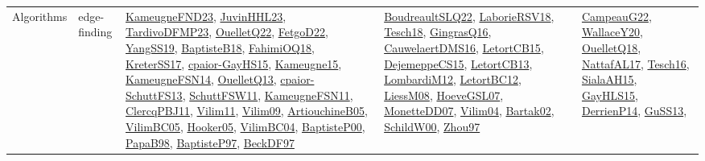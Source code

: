 {\begin{longtable}{lp{3cm}>{\raggedright}p{6cm}>{\raggedright}p{6cm}p{8cm}}
Algorithms & edge-finding & \href{papers/KameugneFND23.pdf}{KameugneFND23}\cite{KameugneFND23}, \href{papers/JuvinHHL23.pdf}{JuvinHHL23}\cite{JuvinHHL23}, \href{papers/TardivoDFMP23.pdf}{TardivoDFMP23}\cite{TardivoDFMP23}, \href{papers/OuelletQ22.pdf}{OuelletQ22}\cite{OuelletQ22}, \href{articles/FetgoD22.pdf}{FetgoD22}\cite{FetgoD22}, \href{papers/YangSS19.pdf}{YangSS19}\cite{YangSS19}, \href{articles/BaptisteB18.pdf}{BaptisteB18}\cite{BaptisteB18}, \href{articles/FahimiOQ18.pdf}{FahimiOQ18}\cite{FahimiOQ18}, \href{articles/KreterSS17.pdf}{KreterSS17}\cite{KreterSS17}, \href{papers/cpaior-GayHS15.pdf}{cpaior-GayHS15}\cite{cpaior-GayHS15}, \href{articles/Kameugne15.pdf}{Kameugne15}\cite{Kameugne15}, \href{articles/KameugneFSN14.pdf}{KameugneFSN14}\cite{KameugneFSN14}, \href{papers/OuelletQ13.pdf}{OuelletQ13}\cite{OuelletQ13}, \href{papers/cpaior-SchuttFS13.pdf}{cpaior-SchuttFS13}\cite{cpaior-SchuttFS13}, \href{articles/SchuttFSW11.pdf}{SchuttFSW11}\cite{SchuttFSW11}, \href{papers/KameugneFSN11.pdf}{KameugneFSN11}\cite{KameugneFSN11}, \href{papers/ClercqPBJ11.pdf}{ClercqPBJ11}\cite{ClercqPBJ11}, \href{papers/Vilim11.pdf}{Vilim11}\cite{Vilim11}, \href{papers/Vilim09.pdf}{Vilim09}\cite{Vilim09}, \href{papers/ArtiouchineB05.pdf}{ArtiouchineB05}\cite{ArtiouchineB05}, \href{articles/VilimBC05.pdf}{VilimBC05}\cite{VilimBC05}, \href{articles/Hooker05.pdf}{Hooker05}\cite{Hooker05}, \href{papers/VilimBC04.pdf}{VilimBC04}\cite{VilimBC04}, \href{articles/BaptisteP00.pdf}{BaptisteP00}\cite{BaptisteP00}, \href{articles/PapaB98.pdf}{PapaB98}\cite{PapaB98}, \href{papers/BaptisteP97.pdf}{BaptisteP97}\cite{BaptisteP97}, \href{papers/BeckDF97.pdf}{BeckDF97}\cite{BeckDF97} & \href{papers/BoudreaultSLQ22.pdf}{BoudreaultSLQ22}\cite{BoudreaultSLQ22}, \href{articles/LaborieRSV18.pdf}{LaborieRSV18}\cite{LaborieRSV18}, \href{papers/Tesch18.pdf}{Tesch18}\cite{Tesch18}, \href{papers/GingrasQ16.pdf}{GingrasQ16}\cite{GingrasQ16}, \href{papers/CauwelaertDMS16.pdf}{CauwelaertDMS16}\cite{CauwelaertDMS16}, \href{articles/LetortCB15.pdf}{LetortCB15}\cite{LetortCB15}, \href{papers/DejemeppeCS15.pdf}{DejemeppeCS15}\cite{DejemeppeCS15}, \href{papers/LetortCB13.pdf}{LetortCB13}\cite{LetortCB13}, \href{articles/LombardiM12.pdf}{LombardiM12}\cite{LombardiM12}, \href{papers/LetortBC12.pdf}{LetortBC12}\cite{LetortBC12}, \href{articles/LiessM08.pdf}{LiessM08}\cite{LiessM08}, \href{papers/HoeveGSL07.pdf}{HoeveGSL07}\cite{HoeveGSL07}, \href{papers/MonetteDD07.pdf}{MonetteDD07}\cite{MonetteDD07}, \href{papers/Vilim04.pdf}{Vilim04}\cite{Vilim04}, \href{papers/Bartak02.pdf}{Bartak02}\cite{Bartak02}, \href{articles/SchildW00.pdf}{SchildW00}\cite{SchildW00}, \href{articles/Zhou97.pdf}{Zhou97}\cite{Zhou97} & \href{articles/CampeauG22.pdf}{CampeauG22}\cite{CampeauG22}, \href{articles/WallaceY20.pdf}{WallaceY20}\cite{WallaceY20}, \href{papers/OuelletQ18.pdf}{OuelletQ18}\cite{OuelletQ18}, \href{articles/NattafAL17.pdf}{NattafAL17}\cite{NattafAL17}, \href{papers/Tesch16.pdf}{Tesch16}\cite{Tesch16}, \href{papers/SialaAH15.pdf}{SialaAH15}\cite{SialaAH15}, \href{papers/GayHLS15.pdf}{GayHLS15}\cite{GayHLS15}, \href{papers/DerrienP14.pdf}{DerrienP14}\cite{DerrienP14}, \href{papers/GuSS13.pdf}{GuSS13}\cite{GuSS13}, 
\end{longtable}}
